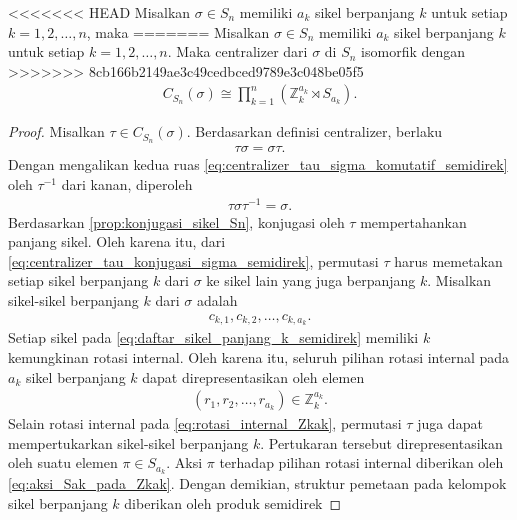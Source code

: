 \begin{teorema}\label{thm:struktur_centralizer}
  <<<<<<< HEAD
  Misalkan $\sigma\in S_n$ memiliki $a_k$ sikel berpanjang $k$ untuk setiap $k=1,2,\ldots,n$, maka
  =======
  Misalkan $\sigma\in S_n$ memiliki $a_k$ sikel berpanjang $k$ untuk setiap $k=1,2,\ldots,n$. Maka centralizer dari $\sigma$ di $S_n$ isomorfik dengan
  >>>>>>> 8cb166b2149ae3c49cedbced9789e3c048be05f5
  \begin{align}\label{eq:struktur_centralizer_semidirek}
    C_{S_n}(\sigma)
    \cong
    \prod_{k=1}^{n}
    \left(
    \mathbb{Z}_k^{a_k}\rtimes S_{a_k}
    \right).
  \end{align}
\end{teorema}

\begin{proof}
  Misalkan $\tau\in C_{S_n}(\sigma)$. Berdasarkan definisi centralizer, berlaku
  \begin{align}\label{eq:centralizer_tau_sigma_komutatif_semidirek}
    \tau\sigma=\sigma\tau.
  \end{align}
  Dengan mengalikan kedua ruas \eqref{eq:centralizer_tau_sigma_komutatif_semidirek} oleh $\tau^{-1}$ dari kanan, diperoleh
  \begin{align}\label{eq:centralizer_tau_konjugasi_sigma_semidirek}
    \tau\sigma\tau^{-1}=\sigma.
  \end{align}
  Berdasarkan \autoref{prop:konjugasi_sikel_Sn}, konjugasi oleh $\tau$ mempertahankan panjang sikel. Oleh karena itu, dari \eqref{eq:centralizer_tau_konjugasi_sigma_semidirek}, permutasi $\tau$ harus memetakan setiap sikel berpanjang $k$ dari $\sigma$ ke sikel lain yang juga berpanjang $k$. Misalkan sikel-sikel berpanjang $k$ dari $\sigma$ adalah
  \begin{align}\label{eq:daftar_sikel_panjang_k_semidirek}
    c_{k,1},c_{k,2},\ldots,c_{k,a_k}.
  \end{align}
  Setiap sikel pada \eqref{eq:daftar_sikel_panjang_k_semidirek} memiliki $k$ kemungkinan rotasi internal. Oleh karena itu, seluruh pilihan rotasi internal pada $a_k$ sikel berpanjang $k$ dapat direpresentasikan oleh elemen
  \begin{align}\label{eq:rotasi_internal_Zkak}
    (r_1,r_2,\ldots,r_{a_k})\in \mathbb{Z}_k^{a_k}.
  \end{align}
  Selain rotasi internal pada \eqref{eq:rotasi_internal_Zkak}, permutasi $\tau$ juga dapat mempertukarkan sikel-sikel berpanjang $k$. Pertukaran tersebut direpresentasikan oleh suatu elemen $\pi\in S_{a_k}$. Aksi $\pi$ terhadap pilihan rotasi internal diberikan oleh \eqref{eq:aksi_Sak_pada_Zkak}. Dengan demikian, struktur pemetaan pada kelompok sikel berpanjang $k$ diberikan oleh produk semidirek

\end{proof}
